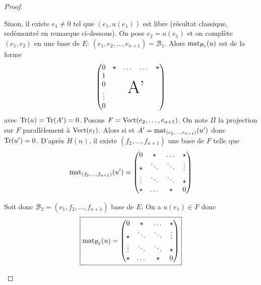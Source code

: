 \begin{proof}
\begin{enumerate}
        Sinon, il existe $e_{1}\neq0$ tel que $(e_{1},u(e_{1}))$ est libre (résultat classique, redémontré en remarque ci-dessous). On pose $e_{2}=u(e_{1})$ et on complète $(e_{1},e_{2})$ en une base de $E$: $(e_{1},e_{2},\dots,e_{n+1})=\mathcal{B}_{1}$. Alors $\operatorname{mat}_{\mathcal{B}_{1}}(u)$ est de la forme 
        \begin{equation}
            \begin{pmatrix}
                0 & 
                \begin{matrix}
                    \star & \dots & \dots & \star    
                \end{matrix}\\
                \begin{matrix}
                    1\\
                    0\\
                    \vdots\\
                    0
                \end{matrix}
                & \mbox{\Huge A'}
            \end{pmatrix}
        \end{equation}
        avec $\operatorname{Tr}(u)=\operatorname{Tr}(A')=0$. Posons $F=\operatorname{Vect}(e_{2},\dots,e_{n+1})$. On note $\Pi$ la projection sur $F$ parallèlement à $\operatorname{Vect}(e_{1})$. Alors si 
        et $A'=\operatorname{mat}_{(e_{2},\dots,e_{n+1})}(u')$ donc $\operatorname{Tr}(u')=0$. D'après $H(n)$, il existe $(f_{2},\dots,f_{n+1})$ une base de $F$ telle que 
        \begin{equation}
            \operatorname{mat}_{(f_{2},\dots,f_{n+1})}(u')=
            \begin{pmatrix}
                0 & \star & \dots & \star\\
                \star & \ddots & \ddots & \vdots\\
                \vdots & \ddots & \ddots & \star\\
                \star & \dots & \star &0
            \end{pmatrix}
        \end{equation}

        Soit donc $\mathcal{B}_{2}=(e_{1},f_{2},\dots,f_{n+1})$ base de $E$. On a $u(e_{1})\in F$ donc 
        \begin{equation}
            \boxed{
            \operatorname{mat}_{\mathcal{B}_{2}}(u)=
            \begin{pmatrix}
                0 & \star & \dots & \star\\
                \star & \ddots & \ddots & \vdots\\
                \vdots & \ddots & \ddots & \star\\
                \star & \dots & \star &0
            \end{pmatrix}
            }
        \end{equation}


\end{enumerate}
\end{proof}
